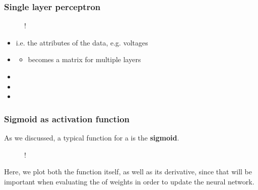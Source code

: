 \documentclass[hyperref={colorlinks=true}]{beamer}
\begin{document}
\begin{frame}%
  \frametitle{Single layer perceptron}

  \begin{figure}
    \centering 
     {!} {
      
    }
  \end{figure}
  
  \begin{itemize}
    \item {}
    \begin{itemize}
      i.e. the attributes of the data, e.g. voltages
    \end{itemize}
    \item {}
    \begin{itemize}
      \item becomes a matrix for multiple layers
    \end{itemize}
    \item {}
    \item {}
    \item {}
  \end{itemize}
  
\end{frame}


\begin{frame}%
  \frametitle{Sigmoid as activation function}

  As we discussed, a typical function for a  is the \textbf{sigmoid}. 

  \begin{figure}
    \centering 
     {!} {
      
    }
  \end{figure}
  
  Here, we plot both the function itself, as well as its derivative, since that will be important when evaluating the  of weights in order to update the neural network.

\end{frame}
\end{document}
